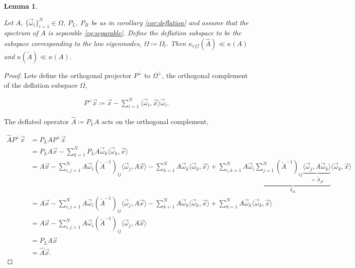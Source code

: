 \documentclass{article}
\theoremstyle{plain} %
\newtheorem{lemma}[theorem]{Lemma}
\theoremstyle{convention} %
\theoremstyle{remark} %
\numberwithin{equation}{section}
\begin{document}
\begin{lemma}
\label{lem:condition_number}

Let $A$, $\{\vec{\omega}_i\}_{i=1}^N \in \Omega$, $P_L$, $P_R$ be as in corollary \ref{cor:deflation} and assume that the spectrum of $A$ is separable \eqref{eq:separable}. Define the deflation subspace to be the subspace corresponding to the low eigenmodes, $\Omega \coloneqq \Omega_l$. Then $\kappa_{eff}(\hat{A}) \ll \kappa(A)$ and $\kappa(\tilde{A}) \ll \kappa(A)$.
\end{lemma}

\begin{proof}

Lets define the orthogonal projector $P^{\perp}$ to $\Omega^{\perp}$, the orthogonal complement of the deflation subspace $\Omega$,

\begin{align*}
    P^{\perp} \vec{x} \coloneqq \vec{x} - \sum_{i=1}^N \langle \vec{\omega}_i, \vec{x} \rangle \vec{\omega}_i.
\end{align*}

The deflated operator $\hat{A} \coloneqq P_L A$ acts on the orthogonal complement,

\begin{align*}
    \hat{A} P^{\perp} \vec{x} &= P_L A P^{\perp} \vec{x} \\
    &= P_L A \vec{x} - \sum_{k=1}^N P_L A \vec{\omega}_k \langle \vec{\omega}_k, \vec{x} \rangle \\
    &= A \vec{x} - \sum_{i,j=1}^N A \vec{\omega}_i (\widetilde{A}^{-1})_{ij} \langle \vec{\omega}_j, A \vec{x} \rangle - \sum_{k=1}^N A \vec{\omega}_k \langle \vec{\omega}_k, \vec{x} \rangle + \sum_{i,k=1}^N A \vec{\omega}_i \underbrace{ \sum_{j=1}^N (\widetilde{A}^{-1})_{ij} \underbrace{\langle \vec{\omega}_j, A \vec{\omega}_k \rangle}_{=\widetilde{A}_{jk}} }_{\delta_{ik}} \langle \vec{\omega}_k, \vec{x} \rangle \\
    &= A \vec{x} - \sum_{i,j=1}^N A \vec{\omega}_i (\widetilde{A}^{-1})_{ij} \langle \vec{\omega}_j, A \vec{x} \rangle - \sum_{k=1}^N A \vec{\omega}_k \langle \vec{\omega}_k, \vec{x} \rangle + \sum_{k=1}^N A \vec{\omega}_k \langle \vec{\omega}_k, \vec{x} \rangle \\
    &= A \vec{x} - \sum_{i,j=1}^N A \vec{\omega}_i (\widetilde{A}^{-1})_{ij} \langle \vec{\omega}_j, A \vec{x} \rangle \\
    &= P_L A \vec{x} \\
    &= \hat{A} \vec{x}.
\end{align*}


\end{proof}
\end{document}
